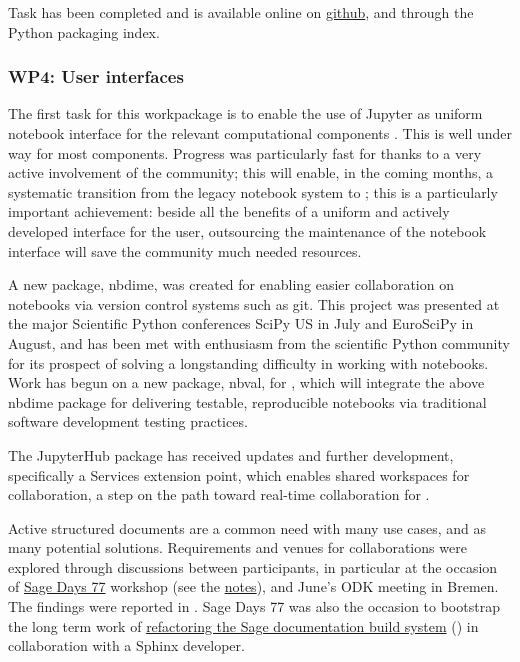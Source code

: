\documentclass{deliverablereport}
\begin{document}
Task  has
been completed and is available online on
\href{https://github.com/joommf/oommfc}{github}, and through the
Python packaging index.

\subsubsection{WP4: User interfaces}

The first task for this workpackage is to enable the use of Jupyter as
uniform notebook interface for the relevant computational components
. This is well under way for most
components. Progress was particularly fast for \Sage thanks to a very
active involvement of the community; this will enable, in the coming
months, a systematic transition from the legacy \Sage notebook system
to \Jupyter; this is a particularly important achievement: beside all
the benefits of a uniform and actively developed interface for the
user, outsourcing the maintenance of the notebook interface will save
the \Sage community much needed resources.

A new \Jupyter package, nbdime, was created for
 enabling easier collaboration on
notebooks via version control systems such as git.  This project was
presented at the major Scientific Python conferences SciPy US in July and EuroSciPy in August, and has been
met with enthusiasm from the scientific Python community for its
prospect of solving a longstanding difficulty in working with
notebooks.  Work has begun on a new package, nbval, for
, which will integrate the above nbdime
package for delivering testable, reproducible notebooks via
traditional software development testing practices.

The JupyterHub package has received updates and further development,
specifically a Services extension point, which enables shared
workspaces for collaboration, a step on the path toward real-time
collaboration for .

Active structured documents are a common need with many use cases, and
as many potential solutions. Requirements and venues for
collaborations were explored through discussions between participants,
in particular at the occasion of
\href{https://wiki.sagemath.org/days77/}{Sage Days 77} workshop (see
the
\href{https://wiki.sagemath.org/days77/live-structured-documents}{notes}),
and June's ODK meeting in Bremen. The findings were reported in
. Sage Days 77 was also the occasion to bootstrap
the long term work of
\href{https://wiki.sagemath.org/days77/documentation}{refactoring the
  Sage documentation build system} () in
collaboration with a Sphinx developer.
\end{document}
